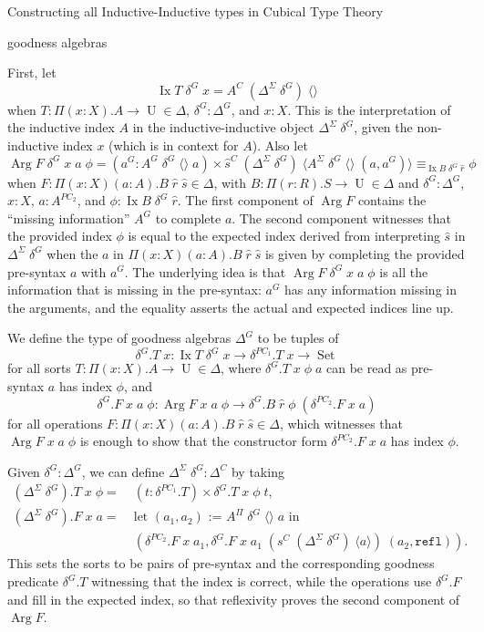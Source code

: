 \documentclass[runningheads]{llncs}
\DeclareMathOperator{\USet}{Set}
\DeclareMathOperator{\UU}{U}
\DeclareMathOperator{\Arg}{Arg}
\DeclareMathOperator{\Ix}{Ix}
\newcommand{\IdA}[3]{{#1}\equiv_{#3}{#2}}
\newcommand{\refl}{\texttt{refl}}
\def\emptytuple{\langle\rangle}
\begin{document}
{\begin{section}{Constructing all Inductive-Inductive types in Cubical Type Theory}
\begin{subsection}{goodness algebras}
\begin{definition}
First, let \[\Ix T\;\delta^G\;x = A^C\;(\Delta^{\Sigma}\;\delta^G)\;\emptytuple\] when $T : \Pi(x : X).A \to \UU \in \Delta$, $\delta^G : \Delta^G$, and $x : X$. This is the interpretation of the inductive index $A$ in the inductive-inductive object $\Delta^\Sigma\;\delta^G$, given the non-inductive index $x$ (which is in context for $A$).
Also let \[\Arg F\;\delta^G\;x\;a\;\phi = (a^G : A^G\;\delta^G\;\emptytuple\;a)\times\IdA{\hat{s}^C\;(\Delta^{\Sigma}\;\delta^G)\;\langle A^{\Sigma}\;\delta^G\;\emptytuple\;(a,a^G)\rangle}{\phi}{\Ix B\;\delta^G\;\hat{r}}\] when $F : \Pi(x : X)(a:A).B\;\hat{r}\;\hat{s} \in \Delta$, with $B : \Pi(r : R).S\to\UU\in\Delta$ and $\delta^G : \Delta^G$, $x : X$, $a : A^{PC_2}$, and $\phi : \Ix B\;\delta^G\;\hat{r}$. The first component of $\Arg F$ contains the ``missing information'' $A^G$ to complete $a$. The second component witnesses that the provided index $\phi$ is equal to the expected index derived from interpreting $\hat{s}$ in $\Delta^\Sigma\;\delta^G$ when the $a$ in $\Pi(x : X)(a : A).B\;\hat{r}\;\hat{s}$ is given by completing the provided pre-syntax $a$ with $a^G$. The underlying idea is that $\Arg F\;\delta^G\;x\;a\;\phi$ is all the information that is missing in the pre-syntax: $a^G$ has any information missing in the arguments, and the equality asserts the actual and expected indices line up.

We define the type of goodness algebras $\Delta^G$ to be tuples of \[\delta^G.T\;x : \Ix T\;\delta^G\;x \to \delta^{PC_1}.T\;x \to \USet\] for all sorts $T : \Pi(x : X).A \to \UU \in \Delta$, where $\delta^G.T\;x\;\phi\;a$ can be read as pre-syntax $a$ has index $\phi$, and
\[\delta^G.F\;x\;a\;\phi : \Arg F\;x\;a\;\phi \to \delta^G.B\;\hat{r}\;\phi\;(\delta^{PC_2}.F\;x\;a)\] for all operations $F : \Pi(x : X)(a : A).B\;\hat{r}\;\hat{s} \in \Delta$, which witnesses that $\Arg F\;x\;a\;\phi$ is enough to show that the constructor form $\delta^{PC_2}.F\;x\;a$ has index $\phi$.

Given $\delta^G : \Delta^G$, we can define $\Delta^\Sigma\;\delta^G : \Delta^C$ by taking \begin{align*}(\Delta^\Sigma\;\delta^G).T\;x\;\phi =&\; (t : \delta^{PC_1}.T)\times \delta^G.T\;x\;\phi\;t,\\
(\Delta^\Sigma\;\delta^G).F\;x\;a =&\; \text{let $(a_1,a_2)$ := $A^{\Pi}\;\delta^G\;\emptytuple\;a$ in}\\&\;(\delta^{PC_2}.F\;x\;a_1, \delta^G.F\;x\;a_1\;(s^C\;(\Delta^\Sigma\;\delta^G)\;\langle a\rangle)\;(a_2,\refl)).\end{align*}
This sets the sorts to be pairs of pre-syntax and the corresponding goodness predicate $\delta^G.T$ witnessing that the index is correct, while the operations use $\delta^G.F$ and fill in the expected index, so that reflexivity proves the second component of $\Arg F$.


\end{definition}
\end{subsection}
\end{section}}
\end{document}

